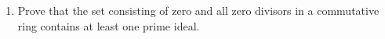 \documentclass[12pt]{article}
\begin{document}
\begin{enumerate}
%
\item 
  Prove that the set consisting of zero and all zero divisors in a commutative ring contains at least one prime ideal.
\vspace{-2pt}
 

\end{enumerate}
\end{document}
